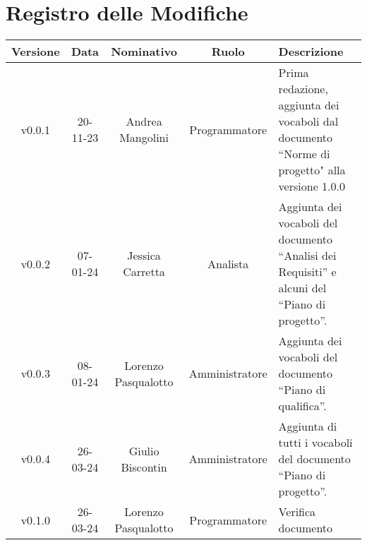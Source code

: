 \section*{\Large Registro delle Modifiche}
    \begin{table}[h]
        \centering
        \renewcommand\tabularxcolumn[1]{m{#1}} %
        \renewcommand{\arraystretch}{1.5}
        \begin{tabularx}{0.98\textwidth}
            {c|c|c|c|>{\centering\arraybackslash}X}
            \rowcolor{black}
            \textbf{\color{white} Versione} & \textbf{\color{white} Data} & \textbf{\color{white} Nominativo} & \textbf{\color{white} Ruolo} & \textbf{\color{white} Descrizione} \\ 
            \hline

            v0.0.1 & 20-11-23 & Andrea Mangolini & Programmatore & Prima redazione, aggiunta dei vocaboli dal documento ``Norme di progetto" alla versione 1.0.0 \\
            v0.0.2 & 07-01-24 & Jessica Carretta & Analista & Aggiunta dei vocaboli del documento ``Analisi dei Requisiti'' e alcuni del ``Piano di progetto''. \\
            v0.0.3 & 08-01-24 & Lorenzo Pasqualotto & Amministratore & Aggiunta dei vocaboli del documento ``Piano di qualifica''. \\
            v0.0.4 & 26-03-24 & Giulio Biscontin & Amministratore & Aggiunta di tutti i vocaboli del documento ``Piano di progetto''. \\
            v0.1.0 & 26-03-24 & Lorenzo Pasqualotto & Programmatore & Verifica documento \\
            \hline
        \end{tabularx}
    \end{table}